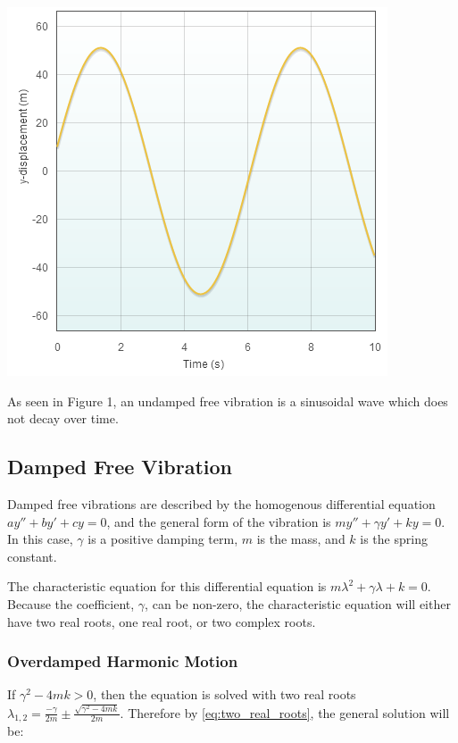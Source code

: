 \documentclass[11pt]{article} %
\newenvironment{Figure}
  {\par\medskip\noindent\minipage{\linewidth}}
  {\endminipage\par\medskip}
\begin{document}
\begin{multicols}{2}
\begin{Figure}
 \centering
 \includegraphics[width=\linewidth]{undamped_free.png}
\end{Figure}

As seen in Figure 1, an undamped free vibration is a sinusoidal wave which does not decay over time. 

\subsection {Damped Free Vibration}
Damped free vibrations are described by the homogenous differential equation $ay'' + by' +cy = 0$, and the general form of the vibration is $my'' + {\gamma}y' + ky = 0$. In this case, $\gamma$ is a positive damping term, $m$ is the mass, and $k$ is the spring constant.

The characteristic equation for this differential equation is $m{\lambda}^2 + {\gamma}{\lambda} + k = 0$. Because the coefficient, $\gamma$, can be non-zero, the characteristic equation will either have two real roots, one real root, or two complex roots.
\subsubsection {Overdamped Harmonic Motion}
If ${\gamma}^2 - 4mk > 0$, then the equation is solved with two real roots ${\lambda}_{1,2} = {\frac{-\gamma}{2m}} \pm \frac{\sqrt{{\gamma}^2 - 4mk}}{2m}$. Therefore by \eqref{eq:two_real_roots}, the general solution will be:


\end{multicols}
\end{document}

